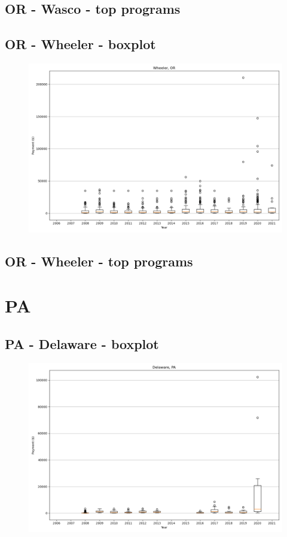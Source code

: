 \subsection*{OR - Wasco - top programs}

\newpage
\subsection*{OR - Wheeler - boxplot}
\begin{figure}[h]
\centering
\includegraphics[width=7in]{../output/boxplots/counties/Wheeler-OR_boxplot.png}
\end{figure}


\subsection*{OR - Wheeler - top programs}

\newpage
\section*{PA}
\subsection*{PA - Delaware - boxplot}
\begin{figure}[h]
\centering
\includegraphics[width=7in]{../output/boxplots/counties/Delaware-PA_boxplot.png}
\end{figure}


